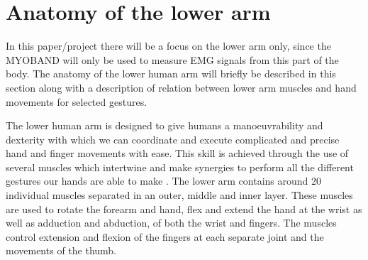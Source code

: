 \section{Anatomy of the lower arm}


In this paper/project there will be a focus on the lower arm only, since the MYOBAND will only be used to measure EMG signals from this part of the body. The anatomy of the lower human arm will briefly be described in this section along with a description of relation between lower arm muscles and hand movements for selected gestures. 


The lower human arm is designed to give humans a manoeuvrability and dexterity with which we can coordinate and execute complicated and precise hand and finger movements with ease. This skill is achieved through the use of several muscles which intertwine and make synergies to perform all the different gestures our hands are able to make \cite{jiang2009} \cite{avella2006}. The lower arm contains around 20 individual muscles separated in an outer, middle and inner layer. These muscles are used to rotate the forearm and hand, flex and extend the hand at the wrist as well as adduction and abduction, of both the wrist and fingers. The muscles control extension and flexion of the fingers at each separate joint and the movements of the thumb. 

